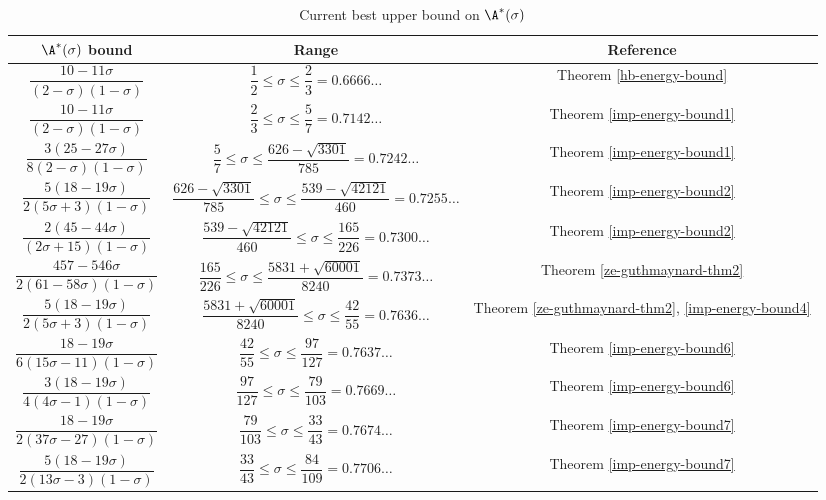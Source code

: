 \begin{table}[ht]
    \def\arraystretch{2}
    \centering
    \caption{Current best upper bound on $\A^*(\sigma)$}
    \begin{tabular}{|c|c|c|}
    \hline
    $\A^*(\sigma)$ bound & Range & Reference\\
    \hline
    $\dfrac{10 - 11\sigma}{(2 - \sigma)(1 - \sigma)}$ & $\dfrac{1}{2} \leq \sigma \le \dfrac{2}{3} = 0.6666\ldots$ & Theorem \ref{hb-energy-bound}\\
    \hline
    $\dfrac{10 - 11\sigma}{(2 - \sigma)(1 - \sigma)}$ & $\dfrac{2}{3} \leq \sigma \le \dfrac{5}{7} = 0.7142\ldots$ & Theorem \ref{imp-energy-bound1}\\
    \hline
    $\dfrac{3(25 - 27\sigma)}{8(2 - \sigma)(1 - \sigma)}$ & $\dfrac{5}{7} \leq \sigma \le \dfrac{626 - \sqrt{3301}}{785} = 0.7242\ldots$ & Theorem \ref{imp-energy-bound1}\\
    \hline
    $\dfrac{5(18 - 19\sigma)}{2(5\sigma + 3)(1 - \sigma)}$ & $\dfrac{626 - \sqrt{3301}}{785} \leq \sigma \le \dfrac{539 - \sqrt{42121}}{460} = 0.7255\ldots$ & Theorem \ref{imp-energy-bound2}\\
    \hline
    $\dfrac{2(45 - 44\sigma)}{(2\sigma + 15)(1 - \sigma)}$ & $\dfrac{539 - \sqrt{42121}}{460} \leq \sigma \le \dfrac{165}{226} = 0.7300\ldots$ & Theorem \ref{imp-energy-bound2}\\
    \hline
    $\dfrac{457 - 546\sigma}{2(61 - 58\sigma)(1-\sigma)}$ & $\dfrac{165}{226} \leq \sigma \le \dfrac{5831 + \sqrt{60001}}{8240} = 0.7373\ldots$ & Theorem \ref{ze-guthmaynard-thm2}\\
    \hline
    $\dfrac{5(18 - 19\sigma)}{2(5\sigma + 3)(1 - \sigma)}$ & $\dfrac{5831 + \sqrt{60001}}{8240} \leq \sigma \le \dfrac{42}{55} = 0.7636\ldots$ & Theorem \ref{ze-guthmaynard-thm2}, \ref{imp-energy-bound4}\\
    \hline
    $\dfrac{18 - 19\sigma}{6(15\sigma - 11)(1- \sigma)}$ & $\dfrac{42}{55} \leq \sigma \le \dfrac{97}{127} = 0.7637\ldots$ & Theorem \ref{imp-energy-bound6}\\
    \hline
    $\dfrac{3(18-19\sigma)}{4(4\sigma-1)(1 - \sigma)}$ & $\dfrac{97}{127} \leq \sigma \le \dfrac{79}{103} = 0.7669\ldots$ & Theorem \ref{imp-energy-bound6}\\
    \hline
    $\dfrac{18 - 19\sigma}{2(37\sigma - 27)(1 - \sigma)}$ & $\dfrac{79}{103} \leq \sigma \le \dfrac{33}{43} = 0.7674\ldots$ & Theorem \ref{imp-energy-bound7}\\
    \hline
    $\dfrac{5(18 - 19\sigma)}{2(13\sigma - 3)(1 - \sigma)}$ & $\dfrac{33}{43} \leq \sigma \le \dfrac{84}{109} = 0.7706\ldots$ & Theorem \ref{imp-energy-bound7}\\

\end{tabular}
\end{table}
